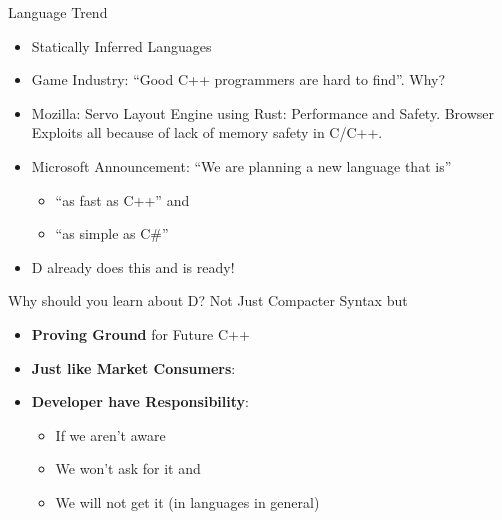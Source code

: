 \documentclass[xcolor=dvipsnames]{beamer}
\begin{document}
\begin{frame}[fragile]{Language Trend}
  \begin{itemize}[<+->]
  \item Statically Inferred Languages
  \item Game Industry: ``Good C++ programmers are hard to find''. Why?
  \item Mozilla: Servo Layout Engine using Rust: Performance and Safety. Browser
    Exploits all because of lack of memory safety in C/C++.
  \item Microsoft Announcement: ``We are planning a new language that is''
    \begin{itemize}[<+->]
    \item ``as fast as C++'' and
    \item ``as simple as C\#''
    \end{itemize}
  \item D already does this and is ready!
  \end{itemize}
\end{frame}

\begin{frame}[fragile]{Why should you learn about D?}
  Not Just Compacter Syntax but
  \begin{itemize}[<+->]
  \item \textbf{Proving Ground} for Future C++
  \item \textbf{Just like Market Consumers}:
  \item \textbf{Developer have Responsibility}:
    \begin{itemize}[<+->]
    \item If we aren't aware
    \item We won't ask for it and
    \item We will not get it (in languages in general)
    \end{itemize}
  \end{itemize}
\end{frame}
\end{document}
